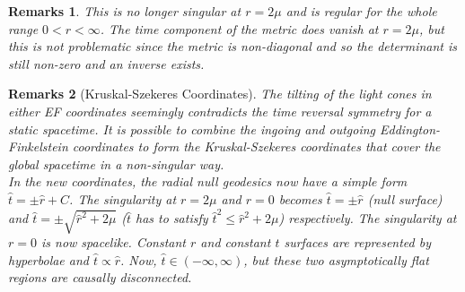 \documentclass[a4paper]{article}
\newtheorem{remarks}{Remarks}[section]
\theoremstyle{new}
\begin{document}
\begin{remarks}
This is no longer singular at $r=2\mu$ and is regular for the whole range $0<r<\infty$. The time component of the metric does vanish at $r=2\mu$, but this is not problematic since the metric is non-diagonal and so the determinant is still non-zero and an inverse exists.
\end{remarks}
\begin{remarks}[Kruskal-Szekeres Coordinates]
The tilting of the light cones in either EF coordinates seemingly contradicts the time reversal symmetry for a static spacetime. It is possible to combine the ingoing and outgoing Eddington-Finkelstein coordinates to form the Kruskal-Szekeres coordinates that cover the global spacetime in a non-singular way.\\[5pt]
In the new coordinates, the radial null geodesics now have a simple form $\hat{t}=\pm\hat{r}+C$. The singularity at $r=2\mu$ and $r=0$ becomes $\hat{t}=\pm\hat{r}$ (null surface) and $\hat{t}=\pm\sqrt{\hat{r}^2+2\mu}$ ($\hat{t}$ has to satisfy $\hat{t}^2\leq\hat{r}^2+2\mu$) respectively. The singularity at $r=0$ is now spacelike. Constant $r$ and constant $t$ surfaces are represented by hyperbolae and $\hat{t}\propto\hat{r}$. Now, $\hat{t}\in(-\infty,\infty)$, but these two asymptotically flat regions are causally
disconnected.
\end{remarks}
\newpage
\end{document}
